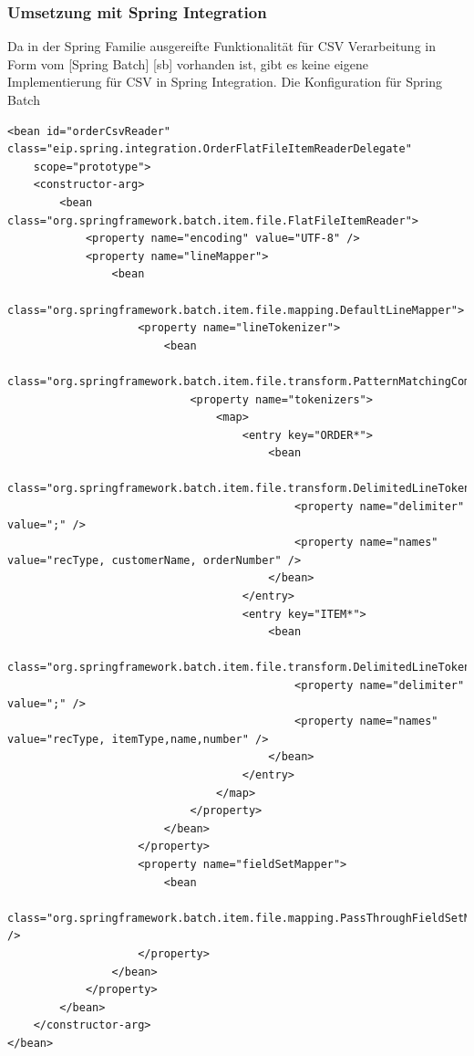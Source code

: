 \documentclass[12pt,a4paper,ngerman]{article}
\begin{document}
\subsubsection{Umsetzung mit Spring Integration}

Da in der Spring Familie ausgereifte Funktionalität für CSV Verarbeitung
in Form vom {[}Spring Batch{]} {[}sb{]} vorhanden ist, gibt es keine
eigene Implementierung für CSV in Spring Integration. Die Konfiguration
für Spring Batch

\begin{lstlisting}
<bean id="orderCsvReader" class="eip.spring.integration.OrderFlatFileItemReaderDelegate"
    scope="prototype">
    <constructor-arg>
        <bean class="org.springframework.batch.item.file.FlatFileItemReader">
            <property name="encoding" value="UTF-8" />
            <property name="lineMapper">
                <bean
                    class="org.springframework.batch.item.file.mapping.DefaultLineMapper">
                    <property name="lineTokenizer">
                        <bean
                            class="org.springframework.batch.item.file.transform.PatternMatchingCompositeLineTokenizer">
                            <property name="tokenizers">
                                <map>
                                    <entry key="ORDER*">
                                        <bean
                                            class="org.springframework.batch.item.file.transform.DelimitedLineTokenizer">
                                            <property name="delimiter" value=";" />
                                            <property name="names" value="recType, customerName, orderNumber" />
                                        </bean>
                                    </entry>
                                    <entry key="ITEM*">
                                        <bean
                                            class="org.springframework.batch.item.file.transform.DelimitedLineTokenizer">
                                            <property name="delimiter" value=";" />
                                            <property name="names" value="recType, itemType,name,number" />
                                        </bean>
                                    </entry>
                                </map>
                            </property>
                        </bean>
                    </property>
                    <property name="fieldSetMapper">
                        <bean
                            class="org.springframework.batch.item.file.mapping.PassThroughFieldSetMapper" />
                    </property>
                </bean>
            </property>
        </bean>
    </constructor-arg>
</bean>
\end{lstlisting}
\end{document}
